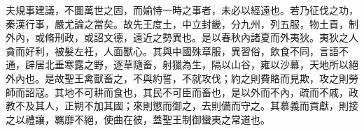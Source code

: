 \begin{pinyinscope}
夫規事建議，不圖萬世之固，而媮恃一時之事者，未必以經遠也。若乃征伐之功，秦漢行事，嚴尤論之當矣。故先王度土，中立封畿，分九州，列五服，物土貢，制外內，或脩刑政，或詔文德，遠近之勢異也。是以春秋內諸夏而外夷狄。夷狄之人貪而好利，被髮左衽，人面獸心。其與中國殊章服，異習俗，飲食不同，言語不通，辟居北垂寒露之野，逐草隨畜，射獵為生，隔以山谷，雍以沙幕，天地所以絕外內也。是故聖王禽獸畜之，不與約誓，不就攻伐；約之則費賂而見欺，攻之則勞師而詔寇。其地不可耕而食也，其民不可臣而畜也，是以外而不內，疏而不戚，政教不及其人，正朔不加其國；來則懲而御之，去則備而守之。其慕義而貢獻，則接之以禮讓，羈靡不絕，使曲在彼，蓋聖王制御蠻夷之常道也。


\end{pinyinscope}